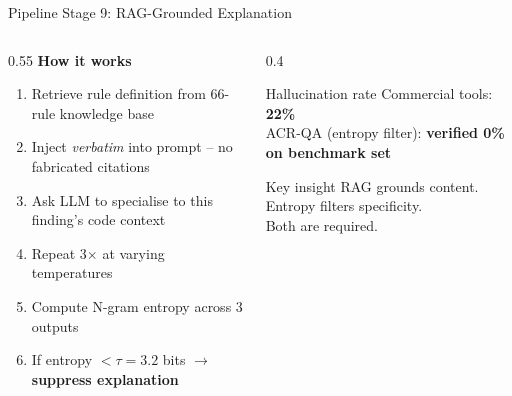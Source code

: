 \documentclass[aspectratio=169,12pt]{beamer}
\newcommand{\bad}[1]{\textbf{\color{acrRed}#1}}
\newcommand{\good}[1]{\textbf{\color{acrGreen}#1}}
\begin{document}
\begin{frame}{Pipeline Stage 9: RAG-Grounded Explanation}
  \begin{columns}[T]
    \begin{column}{0.55\textwidth}
      \textbf{How it works}
      \begin{enumerate}\small
        \item Retrieve rule definition from 66-rule knowledge base
        \item Inject \emph{verbatim} into prompt -- no fabricated citations
        \item Ask LLM to specialise to this finding's code context
        \item Repeat 3\(\times\) at varying temperatures
        \item Compute N-gram entropy across 3 outputs
        \item If entropy $< \tau = 3.2$ bits \(\rightarrow\) \bad{suppress explanation}
      \end{enumerate}
    \end{column}
    \begin{column}{0.4\textwidth}
      \begin{alertblock}{Hallucination rate}
        Commercial tools: \bad{22\%}\\
        ACR-QA (entropy filter): \good{verified 0\% on benchmark set}
      \end{alertblock}
      \vspace{4pt}
      \begin{exampleblock}{Key insight}
        RAG grounds content.\\
        Entropy filters specificity.\\
        Both are required.
      \end{exampleblock}
    \end{column}
  \end{columns}
\end{frame}
\end{document}
